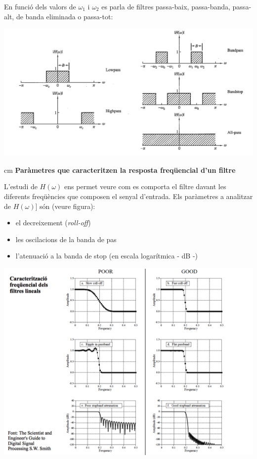 \documentclass{article}
\begin{document}
En funció dels valors de $\omega_1$ i $\omega_2$ es parla de filtres passa-baix,
passa-banda, passa-alt, de banda eliminada o passa-tot:

\includegraphics[width=15cm]{idealfilters.png}


 cm
\textbf{Paràmetres que caracteritzen la resposta freqüencial d'un filtre}

L'estudi de $H(\omega)$ ens permet veure com es comporta el filtre davant les diferents freqüències que composen el senyal d'entrada. 
Els paràmetres a analitzar de $H(\omega)]$ són (veure figura): 
\begin{itemize}
\item el decreixement (\textit{roll-off})
\item les oscilacions de la banda de pas
\item l'atenuació a la banda de stop (en escala logarítmica - dB -)
\end{itemize}

\includegraphics[width=15cm]{carfreqfiltres.png}
\end{document}
